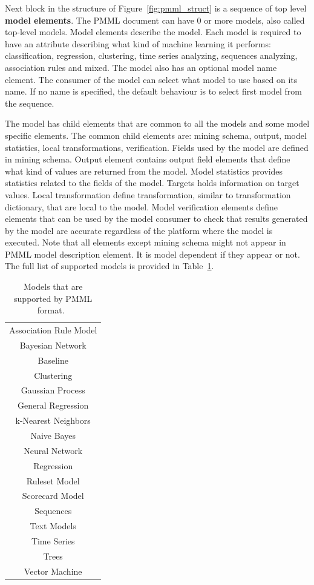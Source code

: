 \documentclass[english, 12pt, a4paper, elec, utf8, online]{aaltothesis}
\begin{document}
Next block in the structure of Figure~\ref{fig:pmml_struct} is a sequence of top level \textbf{model elements}. The PMML document can have 0 or more models, also called top-level models.  Model elements describe the model. Each model is required to have an attribute describing what kind of machine learning it performs: classification, regression, clustering, time series analyzing, sequences analyzing, association rules and mixed. The model also has an optional model name element. The consumer of the model can select what model to use based on its name. If no name is specified, the default behaviour is to select first model from the sequence.

The model has child elements that are common to all the models and some model specific elements. The common child elements are: mining schema, output, model statistics, local transformations, verification. Fields used by the model are defined in mining schema. Output element contains output field elements that define what kind of values are returned from the model. Model statistics provides statistics related to the fields of the model. Targets holds information on target values. Local transformation define transformation, similar to transformation dictionary, that are local to the model. Model verification elements define elements that can be used by the model consumer to check that results generated by the model are accurate regardless of the platform where the model is executed. Note that all elements except mining schema might not appear in PMML model description element. It is model dependent if they appear or not. The full list of supported models is provided in Table~\ref{tab:pmml_sup_models}. 

\begin{table}[h]
\begin{center}
\caption[Models that are supported by PMML format.]{Models that are supported by PMML format.~\cite{pmml_spec}}\label{tab:pmml_sup_models}
\begin{tabular}{c}
Association Rule Model \\
Bayesian Network \\
Baseline \\
Clustering \\
Gaussian Process \\
General Regression \\
k-Nearest Neighbors \\
Naive Bayes \\
Neural Network \\
Regression \\
Ruleset Model\\
Scorecard Model\\
Sequences \\
Text Models \\
Time Series \\
Trees \\
Vector Machine
\end{tabular}
\end{center}
\end{table}
\end{document}
